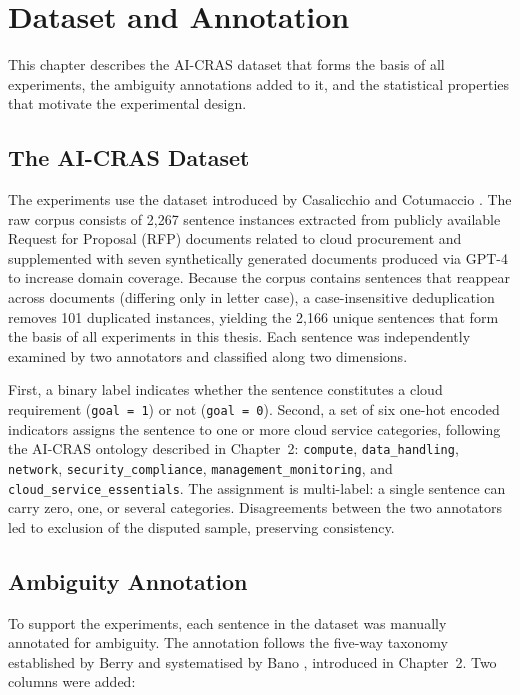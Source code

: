 \chapter{Dataset and Annotation}

This chapter describes the AI-CRAS dataset that forms the basis of all experiments, the ambiguity annotations added to it, and the statistical properties that motivate the experimental design.

\section{The AI-CRAS Dataset}

The experiments use the dataset introduced by Casalicchio and Cotumaccio \cite{casalicchio2024aicras}. The raw corpus consists of 2,267 sentence instances extracted from publicly available Request for Proposal (RFP) documents related to cloud procurement and supplemented with seven synthetically generated documents produced via GPT-4 to increase domain coverage. Because the corpus contains sentences that reappear across documents (differing only in letter case), a case-insensitive deduplication removes 101 duplicated instances, yielding the 2,166 unique sentences that form the basis of all experiments in this thesis. Each sentence was independently examined by two annotators and classified along two dimensions.

First, a binary label indicates whether the sentence constitutes a cloud requirement (\texttt{goal = 1}) or not (\texttt{goal = 0}). Second, a set of six one-hot encoded indicators assigns the sentence to one or more cloud service categories, following the AI-CRAS ontology described in Chapter~2: \texttt{compute}, \texttt{data\_handling}, \texttt{network}, \texttt{security\_compliance}, \texttt{management\_monitoring}, and \texttt{cloud\_service\_essentials}. The assignment is multi-label: a single sentence can carry zero, one, or several categories. Disagreements between the two annotators led to exclusion of the disputed sample, preserving consistency.

\section{Ambiguity Annotation}

To support the experiments, each sentence in the dataset was manually annotated for ambiguity. The annotation follows the five-way taxonomy established by Berry and systematised by Bano \cite{bano2015ambiguity}, introduced in Chapter~2. Two columns were added:

